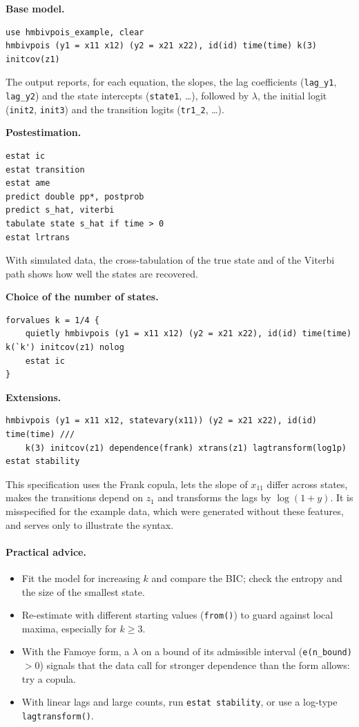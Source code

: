 \documentclass[11pt,a4paper]{article}
\newcommand{\cmd}[1]{\texttt{#1}}
\begin{document}
\medskip\noindent\textbf{Base model.}\par\nopagebreak
\begin{lstlisting}
use hmbivpois_example, clear
hmbivpois (y1 = x11 x12) (y2 = x21 x22), id(id) time(time) k(3) initcov(z1)
\end{lstlisting}
The output reports, for each equation, the slopes, the lag coefficients (\cmd{lag\_y1},
\cmd{lag\_y2}) and the state intercepts (\cmd{state1}, \dots), followed by $\lambda$, the initial logit
(\cmd{init2}, \cmd{init3}) and the transition logits (\cmd{tr1\_2}, \dots).

\medskip\noindent\textbf{Postestimation.}\par\nopagebreak
\begin{lstlisting}
estat ic
estat transition
estat ame
predict double pp*, postprob
predict s_hat, viterbi
tabulate state s_hat if time > 0
estat lrtrans
\end{lstlisting}
With simulated data, the cross-tabulation of the true state and of the Viterbi path shows how well the
states are recovered.

\medskip\noindent\textbf{Choice of the number of states.}\par\nopagebreak
\begin{lstlisting}
forvalues k = 1/4 {
    quietly hmbivpois (y1 = x11 x12) (y2 = x21 x22), id(id) time(time) k(`k') initcov(z1) nolog
    estat ic
}
\end{lstlisting}

\medskip\noindent\textbf{Extensions.}\par\nopagebreak
\begin{lstlisting}
hmbivpois (y1 = x11 x12, statevary(x11)) (y2 = x21 x22), id(id) time(time) ///
    k(3) initcov(z1) dependence(frank) xtrans(z1) lagtransform(log1p)
estat stability
\end{lstlisting}
This specification uses the Frank copula, lets the slope of $x_{11}$ differ across states, makes the
transitions depend on $z_1$ and transforms the lags by $\log(1+y)$. It is misspecified for the example
data, which were generated without these features, and serves only to illustrate the syntax.

\paragraph{Practical advice.}
\begin{itemize}
\item Fit the model for increasing $k$ and compare the BIC; check the entropy and the size of the
smallest state.
\item Re-estimate with different starting values (\cmd{from()}) to guard against local maxima,
especially for $k\ge3$.
\item With the Famoye form, a $\lambda$ on a bound of its admissible interval (\cmd{e(n\_bound)}$>0$)
signals that the data call for stronger dependence than the form allows: try a copula.
\item With linear lags and large counts, run \cmd{estat stability}, or use a log-type
\cmd{lagtransform()}.
\end{itemize}
\end{document}
